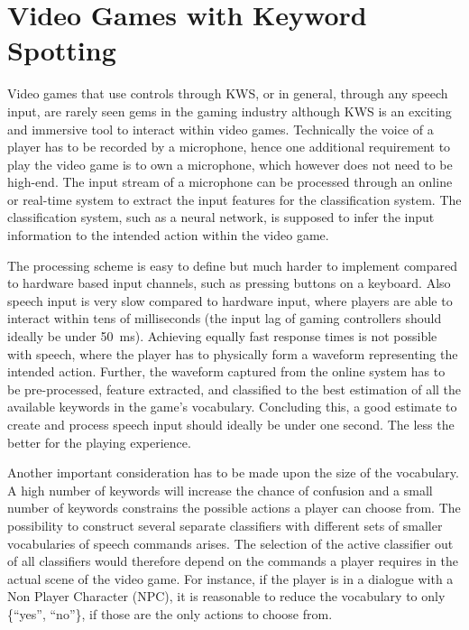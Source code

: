 
\section{Video Games with Keyword Spotting}\label{sec:intro_games}
Video games that use controls through KWS, or in general, through any speech input, are rarely seen gems in the gaming industry although KWS is an exciting and immersive tool to interact within video games.
Technically the voice of a player has to be recorded by a microphone, hence one additional requirement to play the video game is to own a microphone, which however does not need to be high-end.
The input stream of a microphone can be processed through an online or real-time system to extract the input features for the classification system.
The classification system, such as a neural network, is supposed to infer the input information to the intended action within the video game.

The processing scheme is easy to define but much harder to implement compared to hardware based input channels, such as pressing buttons on a keyboard.
Also speech input is very slow compared to hardware input, where players are able to interact within tens of milliseconds (the input lag of gaming controllers should ideally be under \SI{50}{\milli\second}).
Achieving equally fast response times is not possible with speech, where the player has to physically form a waveform representing the intended action.
Further, the waveform captured from the online system has to be pre-processed, feature extracted, and classified to the best estimation of all the available keywords in the game's vocabulary.
Concluding this, a good estimate to create and process speech input should ideally be under one second. 
The less the better for the playing experience.

Another important consideration has to be made upon the size of the vocabulary.
A high number of keywords will increase the chance of confusion and a small number of keywords constrains the possible actions a player can choose from.
The possibility to construct several separate classifiers with different sets of smaller vocabularies of speech commands arises.
The selection of the active classifier out of all classifiers would therefore depend on the commands a player requires in the actual scene of the video game.
For instance, if the player is in a dialogue with a Non Player Character (NPC), it is reasonable to reduce the vocabulary to only \{\enquote{yes}, \enquote{no}\}, if those are the only actions to choose from.

